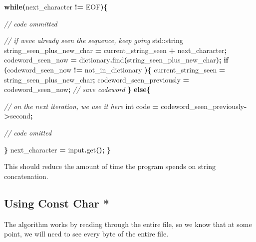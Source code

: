 \documentclass[12pt,twoside]{reedthesis}
\newenvironment{Shaded}{\begin{snugshade}}{\end{snugshade}}
\newcommand{\BuiltInTok}[1]{#1}
\newcommand{\CommentTok}[1]{\textcolor[rgb]{0.56,0.35,0.01}{\textit{#1}}}
\newcommand{\ControlFlowTok}[1]{\textcolor[rgb]{0.13,0.29,0.53}{\textbf{#1}}}
\newcommand{\DataTypeTok}[1]{\textcolor[rgb]{0.13,0.29,0.53}{#1}}
\newcommand{\NormalTok}[1]{#1}
\newcommand{\OperatorTok}[1]{\textcolor[rgb]{0.81,0.36,0.00}{\textbf{#1}}}
\begin{document}
\begin{Shaded}
\begin{Highlighting}[]

\ControlFlowTok{while}\OperatorTok{(}\NormalTok{next\_character }\OperatorTok{!=}\NormalTok{ EOF}\OperatorTok{)\{}

    \CommentTok{// code ommitted}

    \CommentTok{// if we\textquotesingle{}ve already seen the sequence, keep going}
    \BuiltInTok{std::}\NormalTok{string}\OperatorTok{ }\NormalTok{string\_seen\_plus\_new\_char }\OperatorTok{=}\NormalTok{ current\_string\_seen }
                                                \OperatorTok{+}\NormalTok{ next\_character}\OperatorTok{;}
\NormalTok{    codeword\_seen\_now }\OperatorTok{=}\NormalTok{ dictionary}\OperatorTok{.}\NormalTok{find}\OperatorTok{(}\NormalTok{string\_seen\_plus\_new\_char}\OperatorTok{);}
    \ControlFlowTok{if} \OperatorTok{(}\NormalTok{codeword\_seen\_now }\OperatorTok{!=}\NormalTok{ not\_in\_dictionary }\OperatorTok{)\{}
\NormalTok{        current\_string\_seen }\OperatorTok{=}\NormalTok{ string\_seen\_plus\_new\_char}\OperatorTok{;}
\NormalTok{        codeword\_seen\_previously }\OperatorTok{=}\NormalTok{ codeword\_seen\_now}\OperatorTok{;} \CommentTok{// save codeword }
    \OperatorTok{\}}
    \ControlFlowTok{else}\OperatorTok{\{}

        \CommentTok{// on the next iteration, we use it here}
        \DataTypeTok{int}\NormalTok{ code }\OperatorTok{=}\NormalTok{ codeword\_seen\_previously}\OperatorTok{{-}\textgreater{}}\NormalTok{second}\OperatorTok{;}

        \CommentTok{// code omitted}

    \OperatorTok{\}}
\NormalTok{    next\_character }\OperatorTok{=}\NormalTok{ input}\OperatorTok{.}\NormalTok{get}\OperatorTok{();}
\OperatorTok{\}}
\end{Highlighting}
\end{Shaded}
This should reduce the amount of time the program spends on string concatenation.

\hypertarget{using-const-char}{%
\subsection{Using Const Char *}\label{using-const-char}}

The algorithm works by reading through the entire file, so we know that at some point, we will need to see every byte of the entire file.
\end{document}
